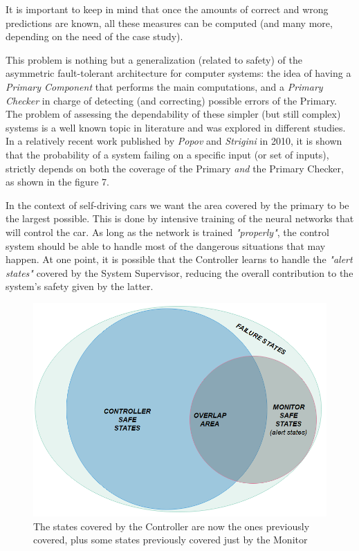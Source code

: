 It is important to keep in mind that once the amounts of correct and wrong predictions are known, all these measures can be computed (and many more, depending on the need of the case study).\newline

This problem is nothing but a generalization (related to safety) of the asymmetric fault-tolerant architecture for computer systems: the idea of having a \textsl{Primary Component} that performs the main computations, and a \textsl{Primary Checker} in charge of detecting (and correcting) possible errors of the Primary.\newline
The problem of assessing the dependability of these simpler (but still complex) systems is a well known topic in literature and was explored in different studies. In a relatively recent work published by \textsl{Popov} and \textsl{Strigini} in 2010, it is shown that the probability of a system failing on a specific input (or set of inputs), strictly depends on both the coverage of the Primary \textsl{and} the Primary Checker, as shown in the figure 7.\cite{striginiPopov}

In the context of self-driving cars we want the area covered by the primary to be the largest possible. This is done by intensive training of the neural networks that will control the car. As long as the network is trained \textsl{"properly"}, the control system should be able to handle most of the dangerous situations that may happen. At one point, it is possible that the Controller learns to handle the \textsl{"alert states"} covered by the System Supervisor, reducing the overall contribution to the system's safety given by the latter.

\begin{figure}[h!]
	\includegraphics[width=\textwidth]{img/area-growth-good.png}
	\caption{The states covered by the Controller are now the ones previously covered, plus some states previously covered just by the Monitor}
\end{figure}

